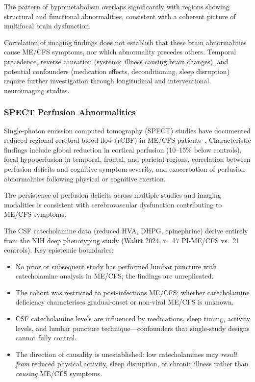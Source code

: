The pattern of hypometabolism overlaps significantly with regions showing structural and functional abnormalities, consistent with a coherent picture of multifocal brain dysfunction.

\begin{limitation}
Correlation of imaging findings does not establish that these brain abnormalities cause ME/CFS symptoms, nor which abnormality precedes others. Temporal precedence, reverse causation (systemic illness causing brain changes), and potential confounders (medication effects, deconditioning, sleep disruption) require further investigation through longitudinal and interventional neuroimaging studies.
\end{limitation}

\subsubsection{SPECT Perfusion Abnormalities}

Single-photon emission computed tomography (SPECT) studies have documented reduced regional cerebral blood flow (rCBF) in ME/CFS patients~\cite{vanCampen2020severity}. Characteristic findings include global reduction in cortical perfusion (10--15\% below controls), focal hypoperfusion in temporal, frontal, and parietal regions, correlation between perfusion deficits and cognitive symptom severity, and exacerbation of perfusion abnormalities following physical or cognitive exertion.

The persistence of perfusion deficits across multiple studies and imaging modalities is consistent with cerebrovascular dysfunction contributing to ME/CFS symptoms.

\begin{limitation}
The CSF catecholamine data (reduced HVA, DHPG, epinephrine) derive entirely from the NIH deep phenotyping study (Walitt 2024, n=17 PI-ME/CFS vs.\ 21 controls). Key epistemic boundaries:
\begin{itemize}
    \item No prior or subsequent study has performed lumbar puncture with catecholamine analysis in ME/CFS; the findings are unreplicated.
    \item The cohort was restricted to post-infectious ME/CFS; whether catecholamine deficiency characterises gradual-onset or non-viral ME/CFS is unknown.
    \item CSF catecholamine levels are influenced by medications, sleep timing, activity levels, and lumbar puncture technique---confounders that single-study designs cannot fully control.
    \item The direction of causality is unestablished: low catecholamines may \emph{result from} reduced physical activity, sleep disruption, or chronic illness rather than \emph{causing} ME/CFS symptoms.
\end{itemize}
\end{limitation}

